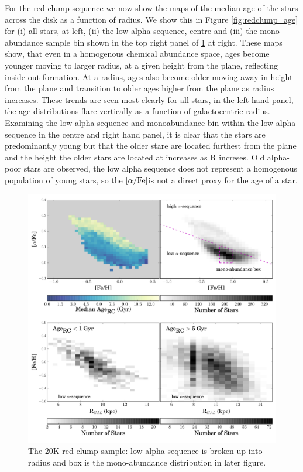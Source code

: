 \documentclass[12pt, preprint]{aastex}
\newcommand{\alphafe}{\mbox{$\rm [\alpha/Fe]$}}
\begin{document}
For the red clump sequence we now show the maps of the median age of the stars across the disk as a function of radius. We show this in Figure \ref{fig:redclump_age} for (i) all stars, at left, (ii) the low alpha sequence, centre and (iii) the mono-abundance sample bin shown in the top right panel of \ref{fig:redclump} at right. These maps show, that even in a homogenous chemical abundance space, ages become younger moving to larger radius, at a given height from the plane, reflecting inside out formation. At a radius, ages also become older moving away in height from the plane and transition to older ages higher from the plane as radius increases. These trends are seen most clearly for all stars, in the left hand panel, the age distributions flare vertically as a function of galactocentric radius. Examining the low-alpha sequence and monoabundance bin within the low alpha sequence in the centre and right hand panel, it is clear that the stars are predominantly young but that the older stare are located furthest from the plane and the height the older stars are located at increases as R increses. Old alpha-poor stars are observed, the low alpha sequence does not represent a homogenous population of young stars, so the \alphafe is not a direct proxy for the age of a star. 

%


\begin{figure}[p!]
\centering
 \includegraphics[scale=0.4]{./plots/redclump_4panel.pdf}
    \caption{The 20K red clump sample: low alpha sequence is broken up into radius and box is the mono-abundance distribution in later figure.}
\label{fig:redclump}
\end{figure}
\end{document}
